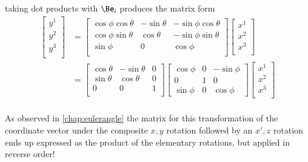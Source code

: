 taking dot products with $\Be_i$ produces the matrix form
\begin{align*}
\begin{bmatrix}
y^1 \\
y^2 \\
y^3 \\
\end{bmatrix}
&=
\begin{bmatrix}
\cos\phi \cos\theta & - \sin\theta & - \sin\phi \cos\theta \\
\cos\phi \sin\theta & \cos\theta & - \sin\phi \sin\theta \\
\sin\phi & 0 & \cos\phi \\
\end{bmatrix}
\begin{bmatrix}
x^1 \\
x^2 \\
x^3 \\
\end{bmatrix} \\
&=
\begin{bmatrix}
\cos\theta & -\sin\theta & 0 \\
\sin\theta & \cos\theta & 0 \\
0 & 0 & 1 \\
\end{bmatrix}
\begin{bmatrix}
\cos\phi & 0 & -\sin\phi \\
0 & 1 & 0 \\
\sin\phi & 0 & \cos\phi
\end{bmatrix}
\begin{bmatrix}
x^1 \\
x^2 \\
x^3 \\
\end{bmatrix} \\
\end{align*}

As observed in 
\ref{chap:eulerangle}
the matrix for this transformation of the coordinate vector under the composite $x,y$ rotation followed by
an $x', z$ rotation ends up expressed as the product of the elementary rotations, but applied in reverse order!

